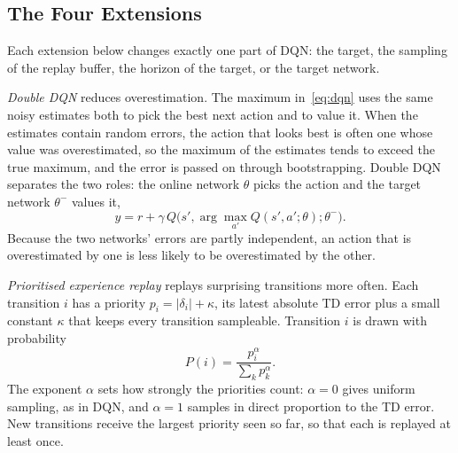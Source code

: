 \documentclass[conference,a4paper]{IEEEtran}
\begin{document}
\subsection{The Four Extensions}\label{sec:extensions}
Each extension below changes exactly one part of DQN: the target, the sampling of the replay buffer, the horizon of
the target, or the target network.

\emph{Double DQN} \citep{vanhasselt2016deep} reduces overestimation. The maximum in~\eqref{eq:dqn} uses the same noisy
estimates both to pick the best next action and to value it. When the estimates contain random errors, the action that
looks best is often one whose value was overestimated, so the maximum of the estimates tends to exceed the true
maximum, and the error is passed on through bootstrapping. Double DQN separates the two roles: the online network
$\theta$ picks the action and the target network $\theta^-$ values it,
\begin{equation}
y=r+\gamma\,Q\big(s',\textstyle\arg\max_{a'}Q(s',a';\theta);\theta^-\big).
\end{equation}
Because the two networks' errors are partly independent, an action that is overestimated by one is less likely to be
overestimated by the other.

\emph{Prioritised experience replay} \citep{schaul2016prioritized} replays surprising transitions more often. Each
transition $i$ has a priority $p_i=|\delta_i|+\kappa$, its latest absolute TD error plus a small constant $\kappa$
that keeps every transition sampleable. Transition $i$ is drawn with probability
\begin{equation}
P(i)=\frac{p_i^{\alpha}}{\sum_k p_k^{\alpha}}.
\end{equation}
The exponent $\alpha$ sets how strongly the priorities count: $\alpha=0$ gives uniform sampling, as in DQN, and
$\alpha=1$ samples in direct proportion to the TD error. New transitions receive the largest priority seen so far,
so that each is replayed at least once.
\end{document}

